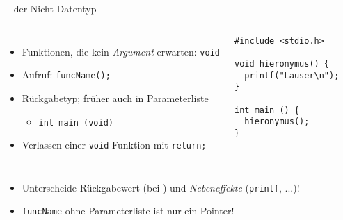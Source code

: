 
\begin{frame}[fragile]{ -- der Nicht-Datentyp}
%
\begin{columns}[T]
\begin{itemize}
\item Funktionen, die kein \emph{Argument} erwarten: \texttt{void}
\item Aufruf: \texttt{funcName();}
\item Rückgabetyp; früher auch in Parameterliste
	\begin{itemize}
	\item \texttt{int main (void)}
	\end{itemize}
\item Verlassen einer \texttt{void}-Funktion mit \texttt{return;}
\end{itemize}
%
\vspace{-10pt}
\begin{codebox}
\begin{verbatim}
#include <stdio.h>

void hieronymus() {
  printf("Lauser\n");
}

int main () {
  hieronymus();
}
\end{verbatim}
\end{codebox}
\end{columns}
%
\begin{hintbox}
\begin{itemize}
\item Unterscheide Rückgabewert (bei ) und \emph{Nebeneffekte} (\texttt{printf}, ...)!
\item \texttt{funcName} ohne Parameterliste ist nur ein Pointer!
\end{itemize}
\end{hintbox}
%
\end{frame}


